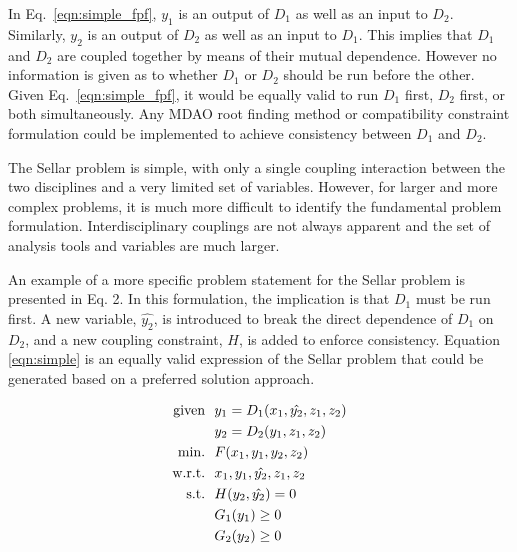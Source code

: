     
    In Eq.~\ref{eqn:simple_fpf}, $y_1$ is an output of $D_1$ as well as an input 
    to $D_2$. Similarly, $y_2$ is an output of $D_2$ as well as an input 
    to $D_1$. This implies that $D_1$ and $D_2$ are coupled together by means 
    of their mutual dependence. However no information is given as to whether
    $D_1$ or $D_2$ should be run before the other. Given Eq.~\ref{eqn:simple_fpf}, 
    it would be equally valid to run $D_1$ first, $D_2$ first, or both simultaneously. 
Any MDAO root finding method or compatibility constraint formulation could be implemented to achieve consistency between $D_1$ and $D_2$.
    
    The Sellar problem is simple, with only a single coupling interaction 
    between the two disciplines and a very limited set of variables. 
 However, for larger and more complex problems, 
    it is much more difficult to identify the fundamental problem formulation. Interdisciplinary 
    couplings are not always apparent and the set of analysis tools and variables are 
    much larger. 

An example of a more specific problem statement for the Sellar problem is presented in Eq. 2.  
In this formulation, the implication is that  $D_1$ must be run 
    first. A new variable, $\hat{y_2}$, is introduced to break the direct dependence of
    $D_1$ on $D_2$, and a new coupling constraint, $H$, is added to enforce 
    consistency. Equation \ref{eqn:simple} is 
    an equally valid expression of the Sellar problem that could be 
    generated  based on a preferred solution approach.

    \begin{align}
        \textrm{given} & \ \ y_1 = D_1(x_1,\hat{y_2},z_1,z_2) \notag
        \\      & \ \ y_2 = D_2(y_1,z_1,z_2) \notag
        \\\textrm{min.} &\ \ F(x_1,y_1,y_2,z_2) \notag
        \\\textrm{w.r.t.} & \ \ x_1,y_1,\hat{y_2},z_1,z_2 \notag
        \\\textrm{s.t.} & \ \ H(y_2,\hat{y_2}) = 0 \notag 
        \\     & \ \ G_1(y_1) \geq 0 \notag
        \\     & \ \ G_2(y_2) \geq 0
        \label{eqn:simple}
    \end{align}


